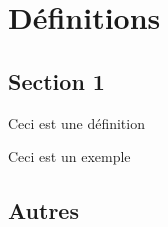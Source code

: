 
\chapter{Définitions}

\section{Section 1}

\begin{definition}
  Ceci est une définition
\end{definition}

\begin{example}
  Ceci est un exemple
\end{example}


\section{Autres}

